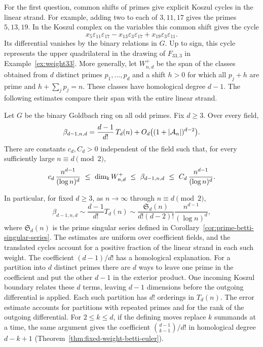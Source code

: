 For the first question, common shifts of primes give explicit Koszul
cycles in the linear strand. For example, adding two to each of $3,11,17$ gives
the primes $5,13,19$. In the Koszul complex on the variables this
common shift gives the cycle
\[
 x_5\varepsilon_{11}\varepsilon_{17}
 -x_{13}\varepsilon_3\varepsilon_{17}
 +x_{19}\varepsilon_3\varepsilon_{11}.
\]
Its differential vanishes by the binary relations in $G$. Up to sign,
this cycle represents the upper quadrilateral in the drawing of
$F_{33,3}$ in Example~\ref{ex:weight33}.
More generally, let $W^+_{n,d}$ be the span of the classes obtained
from $d$ distinct primes $p_1,\ldots,p_d$ and a shift $h>0$ for which
all $p_j+h$ are prime and $h+\sum_jp_j=n$. These classes have
homological degree $d-1$. The following estimates compare their span
with the entire linear strand.

\begin{maintheorem}
\label{main:weightwise}
Let $G$ be the binary Goldbach ring on all odd primes. Fix $d\ge3$.
Over every field,
\[
 \beta_{d-1,n,d}
 =\frac{d-1}{d!}\,T_d(n)+O_d\bigl((1+|\mathcal A_n|)^{d-2}\bigr).
\]
There are constants
$c_d,C_d>0$ independent of the field such that, for every sufficiently
large $n\equiv d\pmod2$,
\[
 c_d\,\frac{n^{d-1}}{(\log n)^d}
 \ \le\ \dim_\Bbbk W^+_{n,d}
 \ \le\ \beta_{d-1,n,d}
 \ \le\ C_d\,\frac{n^{d-1}}{(\log n)^d}.
\]
\end{maintheorem}

In particular, for fixed $d\ge3$, as $n\to\infty$ through
$n\equiv d\pmod2$,
\[
 \beta_{d-1,n,d}\sim\frac{d-1}{d!}T_d(n)
 \sim\frac{\mathfrak S_d(n)}{d!(d-2)!}
             \frac{n^{d-1}}{(\log n)^d},
\]
where $\mathfrak S_d(n)$ is the prime singular series defined in
Corollary~\ref{cor:prime-betti-singular-series}. The estimates are
uniform over coefficient fields, and the translated cycles account
for a positive fraction of the linear strand in each such weight.
The coefficient $(d-1)/d!$ has a homological explanation.
For a partition into $d$ distinct primes there are $d$ ways to leave
one prime in the coefficient and put the other $d-1$ in the exterior
product. One incoming Koszul boundary relates these $d$ terms, leaving
$d-1$ dimensions before the outgoing differential is applied. Each
such partition has $d!$ orderings in $T_d(n)$. The error estimate
accounts for partitions with repeated primes and for the rank of the
outgoing differential. For $2\le k\le d$, if the defining moves replace
$k$ summands at a time, the same argument gives the
coefficient $\binom{d-1}{k-1}/d!$ in homological degree $d-k+1$
(Theorem~\ref{thm:fixed-weight-betti-euler}).

